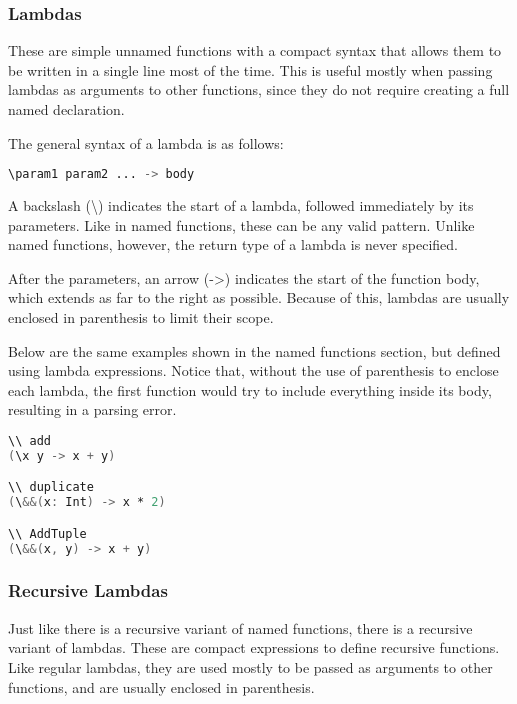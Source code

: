 \documentclass{article}
\begin{document}
\subsubsection{Lambdas}

These are simple unnamed functions with a compact syntax that allows them to be written in a single line most of the time.
This is useful mostly when passing lambdas as arguments to other functions, since they do not require creating a full named declaration.

The general syntax of a lambda is as follows:

\begin{lstlisting}[language=V, escapechar=&]
\param1 param2 ... -> body
\end{lstlisting}

A backslash (\textbackslash) indicates the start of a lambda, followed immediately by its parameters.
Like in named functions, these can be any valid pattern.
Unlike named functions, however, the return type of a lambda is never specified.

After the parameters, an arrow (->) indicates the start of the function body, which extends as far to the right as possible.
Because of this, lambdas are usually enclosed in parenthesis to limit their scope.

Below are the same examples shown in the named functions section, but defined using lambda expressions.
Notice that, without the use of parenthesis to enclose each lambda, the first function would try to include everything inside its body, resulting in a parsing error.

\begin{lstlisting}[language=V, escapechar=&]
\\ add
(\x y -> x + y)

\\ duplicate
(\&&(x: Int) -> x * 2)

\\ AddTuple
(\&&(x, y) -> x + y)
\end{lstlisting}

\subsubsection{Recursive Lambdas}

Just like there is a recursive variant of named functions, there is a recursive variant of lambdas.
These are compact expressions to define recursive functions.
Like regular lambdas, they are used mostly to be passed as arguments to other functions, and are usually enclosed in parenthesis.
\end{document}
